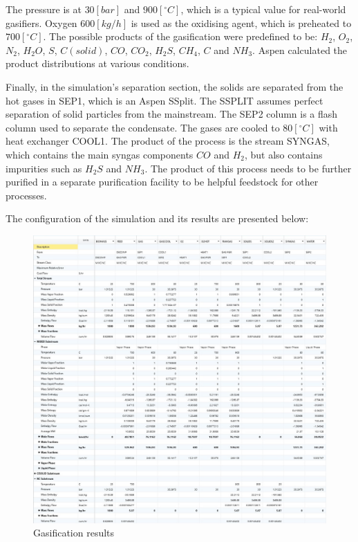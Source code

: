 The pressure is at $30 [bar]$ and $900 [^\circ C]$, which is a typical value for real-world gasifiers. Oxygen $600 [kg/h]$ is used as the oxidising agent, which is preheated to $700 [^\circ C]$. The possible products of the gasification were predefined to be: $H_2$, $O_2$, $N_2$, $H_2O$, $S$, $C(solid)$, $CO$, $CO_2$, $H_2S$, $CH_4$, $C$ and $NH_3$. Aspen calculated the product distributions at various conditions.

Finally, in the simulation's separation section, the solids are separated from the hot gases in SEP1, which is an Aspen SSplit. The SSPLIT assumes perfect separation of solid particles from the mainstream. The SEP2 column is a flash column used to separate the condensate. The gases are cooled to $80 [^\circ C]$ with heat exchanger COOL1. The product of the process is the stream SYNGAS, which contains the main syngas components $CO$ and $H_2$, but also contains impurities such as $H_2S$ and $NH_3$. The product of this process needs to be further purified in a separate purification facility to be helpful feedstock for other processes.

The configuration of the simulation and its results are presented below:

\newpage %
\begin{figure}[h!]
	\centering
	\includegraphics[width=\linewidth]{Figures/TchermochemicalProcesses/GasificationResults.jpg}
	\caption{Gasification results}
\end{figure}

